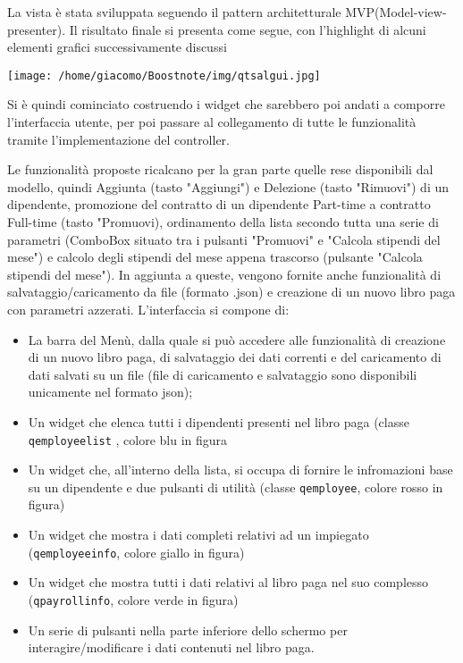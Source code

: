 \documentclass[a4paper,10pt]{article}
\begin{document}
La vista è stata sviluppata seguendo il pattern architetturale MVP(Model-view-presenter). Il risultato finale si presenta come segue, con l'highlight di alcuni elementi grafici successivamente discussi

\begin{center}
\texttt{[image: /home/giacomo/Boostnote/img/qtsalgui.jpg]}
\end{center}

Si è quindi cominciato costruendo i widget che sarebbero poi andati a comporre l'interfaccia utente, per poi passare al collegamento di tutte le funzionalità tramite l'implementazione del controller.

Le funzionalità proposte ricalcano per la gran parte quelle rese disponibili dal modello, quindi Aggiunta (tasto "Aggiungi") e Delezione (tasto "Rimuovi") di un dipendente, promozione del contratto di un dipendente Part-time a contratto Full-time (tasto "Promuovi), ordinamento della lista secondo tutta una serie di parametri (ComboBox situato tra i pulsanti "Promuovi" e "Calcola stipendi del mese") e calcolo degli stipendi del mese appena trascorso (pulsante "Calcola stipendi del mese"). In aggiunta a queste, vengono fornite anche funzionalità di salvataggio/caricamento da file (formato .json) e creazione di un nuovo libro paga con parametri azzerati. L'interfaccia si compone di:
\begin{itemize}
\item La barra del Menù, dalla quale si può accedere alle funzionalità di creazione di un nuovo libro paga, di salvataggio dei dati correnti e del caricamento di dati salvati su un file (file di caricamento e salvataggio sono disponibili unicamente nel formato json);
\item Un widget che elenca tutti i dipendenti presenti nel libro paga (classe \verb+qemployeelist+ , colore blu in figura
\item Un widget che, all'interno della lista, si occupa di fornire le infromazioni base su un dipendente e due pulsanti di utilità (classe \verb+qemployee+, colore rosso in figura)
\item Un widget che mostra i dati completi relativi ad un impiegato (\verb+qemployeeinfo+, colore giallo in figura)
\item Un widget che mostra tutti i dati relativi al libro paga nel suo complesso (\verb+qpayrollinfo+, colore verde in figura)
\item Un serie di pulsanti nella parte inferiore dello schermo per interagire/modificare i dati contenuti nel libro paga.
\end{itemize}
\end{document}

